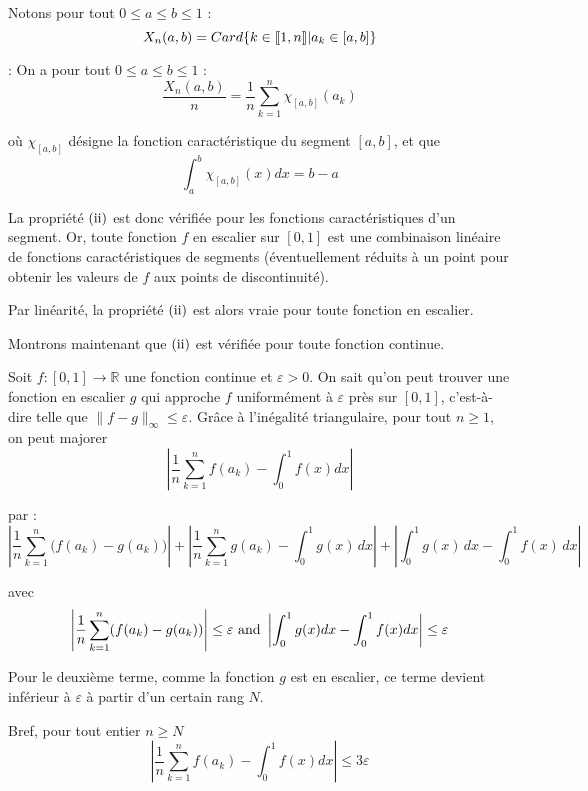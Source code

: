 
\tmtextbf{}Notons pour tout $0 \leq a \leq b \leq 1$ :
\[ X_n (a, b) = Card\{k \in \llbracket 1, n \rrbracket  |  a_k \in
   [a, b]\} \]


: On a pour tout $0 \leq a \leq b \leq 1$ :
\[ \frac{X_n (a, b)}{n} = \frac{1}{n}  \sum_{k = 1}^n \chi_{[a, b]} (a_k) \]


o{\`u} $\chi_{[a, b]}$ d{\'e}signe la fonction caract{\'e}ristique du segment
$[a, b]$, et que
\[ \int_a^b \chi_{[a, b]} (x) dx = b - a \]


La propri{\'e}t{\'e} $(\operatorname{ii})$ est donc v{\'e}rifi{\'e}e pour les
fonctions caract{\'e}ristiques d'un segment. Or, toute fonction $f$ en
escalier sur $[0, 1]$ est une combinaison lin{\'e}aire de fonctions
caract{\'e}ristiques de segments ({\'e}ventuellement r{\'e}duits {\`a} un
point pour obtenir les valeurs de $f$ aux points de discontinuit{\'e}).

Par lin{\'e}arit{\'e}, la propri{\'e}t{\'e} $(\operatorname{ii})$ est alors vraie
pour toute fonction en escalier.

Montrons maintenant que $(\operatorname{ii})$ est v{\'e}rifi{\'e}e pour toute
fonction continue.

Soit $f : [0, 1] \to \mathbb{R}$ une fonction continue et $\varepsilon > 0$.
On sait qu'on peut trouver une fonction en escalier $g$ qui approche $f$
uniform{\'e}ment {\`a} $\varepsilon$ pr{\`e}s sur $[0, 1]$, c'est-{\`a}-dire
telle que $\|f - g\|_{\infty} \leq \varepsilon$. Gr{\^a}ce {\`a}
l'in{\'e}galit{\'e} triangulaire, pour tout $n \geq 1$, on peut majorer
\[ \left| \frac{1}{n}  \sum_{k = 1}^n f (a_k) - \int_0^1 f (x) dx \right| \]


par :
\[
\left| \frac{1}{n} \sum_{k=1}^n \bigl( f(a_k) - g(a_k) \bigr) \right|
+ \left| \frac{1}{n} \sum_{k=1}^n g(a_k) - \int_0^1 g(x) \, dx \right|
+ \left| \int_0^1 g(x) \, dx - \int_0^1 f(x) \, dx \right|
\]


avec
\[ \left| \frac{1}{n}  \sum_{k = 1}^n (f (a_k) - g (a_k)) \right| \leq
   \varepsilon \text{ and } \left| \int_0^1 g (x) dx - \int_0^1 f (x) dx \right|
   \leq \varepsilon \]


Pour le deuxi{\`e}me terme, comme la fonction $g$ est en escalier, ce terme
devient inf{\'e}rieur {\`a} $\varepsilon$ {\`a} partir d'un certain rang $N$.

Bref, pour tout entier $n \geq N$
\[ \left| \frac{1}{n}  \sum_{k = 1}^n f (a_k) - \int_0^1 f (x) dx \right|
   \leq 3 \varepsilon \]



